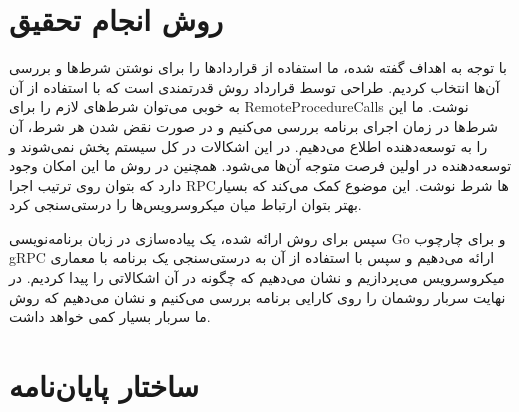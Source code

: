 \section{روش انجام تحقیق}
با توجه به اهداف گفته شده، ما استفاده از قراردادها را برای نوشتن شرط‌ها و بررسی آن‌ها انتخاب کردیم. طراحی توسط قرارداد روش قدرتمندی است که با استفاده از آن به خوبی می‌توان شرط‌های لازم را برای
\glspl{RemoteProcedureCall}
نوشت. ما این شرط‌ها در زمان اجرای برنامه بررسی می‌کنیم و در صورت نقض شدن هر شرط، آن را به توسعه‌دهنده اطلاع می‌دهیم. در این اشکالات در کل سیستم پخش نمی‌شوند و توسعه‌دهنده در اولین فرصت متوجه آن‌ها می‌شود. همچنین در روش ما این امکان وجود دارد که بتوان روی ترتیب اجرا
\gls{RPC}ها
شرط نوشت. این موضوع کمک می‌کند که بسیار بهتر بتوان ارتباط میان میکروسرویس‌ها را درستی‌سنجی کرد.

سپس برای روش ارائه شده، یک پیاده‌سازی در زبان برنامه‌نویسی
Go \cite{golang}
و برای چارچوب
gRPC \cite{grpc}
ارائه می‌دهیم و سپس با استفاده از آن به درستی‌سنجی یک برنامه با معماری میکروسرویس می‌پردازیم و نشان می‌دهیم که چگونه در آن اشکالاتی را پیدا کردیم. در نهایت سربار روشمان را روی کارایی برنامه بررسی می‌کنیم و نشان می‌دهیم که روش ما سربار بسیار کمی خواهد داشت.

\section{ساختار پایان‌نامه}
